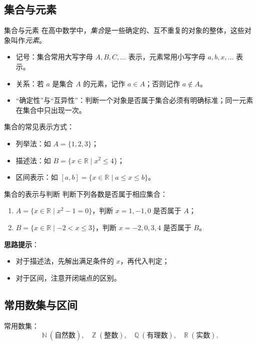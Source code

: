 \documentclass[a4paper,11pt]{ctexart}
\begin{document}
\subsection{集合与元素}

\begin{definitionbox}{集合与元素}
在高中数学中，\emph{集合}是一些确定的、互不重复的对象的整体，这些对象叫作\emph{元素}。
\begin{itemize}
  \item 记号：集合常用大写字母 $A,B,C,\dots$ 表示，元素常用小写字母 $a,b,x,\dots$ 表示。
  \item 关系：若 $a$ 是集合 $A$ 的元素，记作 $a\in A$；否则记作 $a\notin A$。
  \item “确定性”与“互异性”：判断一个对象是否属于集合必须有明确标准；同一元素在集合中只出现一次。
\end{itemize}
\end{definitionbox}

集合的常见表示方式：
\begin{itemize}
  \item 列举法：如 $A=\{1,2,3\}$；
  \item 描述法：如 $B=\{x\in\mathbb{R}\mid x^2\le 4\}$；
  \item 区间表示：如 $[a,b]=\{x\in\mathbb{R}\mid a\le x\le b\}$。
\end{itemize}

\begin{examplebox}{集合的表示与判断}
判断下列各数是否属于相应集合：
\begin{enumerate}
  \item $A=\{x\in\mathbb{R}\mid x^2-1=0\}$，判断 $x=1,-1,0$ 是否属于 $A$；
  \item $B=\{x\in\mathbb{R}\mid -2<x\le 3\}$，判断 $x=-2,0,3,4$ 是否属于 $B$。
\end{enumerate}
\textbf{思路提示}：
\begin{itemize}
  \item 对于描述法，先解出满足条件的 $x$，再代入判定；
  \item 对于区间，注意开闭端点的区别。
\end{itemize}
\end{examplebox}

\subsection{常用数集与区间}

常用数集：
\[
\mathbb{N}\ (\text{自然数}),\quad
\mathbb{Z}\ (\text{整数}),\quad
\mathbb{Q}\ (\text{有理数}),\quad
\mathbb{R}\ (\text{实数}).
\]
\end{document}
